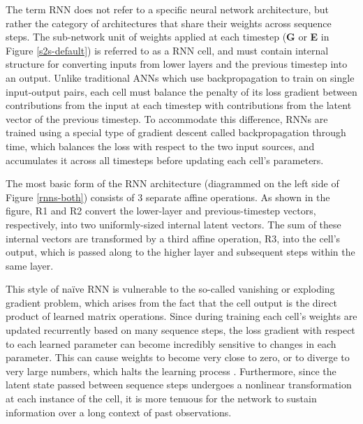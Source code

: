 The term RNN does not refer to a specific neural network architecture, but rather the category of architectures that share their weights across sequence steps. The sub-network unit of weights applied at each timestep (\textbf{G} or \textbf{E} in Figure \ref{s2s-default}) is referred to as a RNN cell, and must contain internal structure for converting inputs from lower layers and the previous timestep into an output. Unlike traditional ANNs which use backpropagation to train on single input-output pairs, each cell must balance the penalty of its loss gradient between contributions from the input at each timestep with contributions from the latent vector of the previous timestep. To accommodate this difference, RNNs are trained using a special type of gradient descent called backpropagation through time, which balances the loss with respect to the two input sources, and accumulates it across all timesteps before updating each cell's parameters.

The most basic form of the RNN architecture (diagrammed on the left side of Figure \ref{rnns-both}) consists of 3 separate affine operations. As shown in the figure, R1 and R2 convert the lower-layer and previous-timestep vectors, respectively, into two uniformly-sized internal latent vectors. The sum of these internal vectors are transformed by a third affine operation, R3, into the cell's output, which is passed along to the higher layer and subsequent steps within the same layer.

This style of na\"ive RNN is vulnerable to the so-called vanishing or exploding gradient problem, which arises from the fact that the cell output is the direct product of learned matrix operations. Since during training each cell's weights are updated recurrently based on many sequence steps, the loss gradient with respect to each learned parameter can become incredibly sensitive to changes in each parameter. This can cause weights to become very close to zero, or to diverge to very large numbers, which halts the learning process \citep{mozer_focused_1995}. Furthermore, since the latent state passed between sequence steps undergoes a nonlinear transformation at each instance of the cell, it is more tenuous for the network to sustain information over a long context of past observations.

